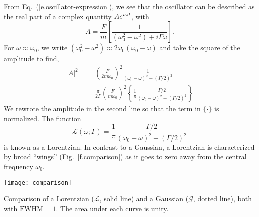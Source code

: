 From Eq.~(\ref{e.oscillator-expression}), we see that the oscillator can be described as the real part of a complex quantity $Ae^{i\omega t}$, with
\[
    A = \frac{F}{m}\left[\frac{1}{\left(\omega_0^2-\omega^2\right) + i\Gamma\omega}\right].
\]
For $\omega \approx \omega_0$, we write $(\omega_0^2-\omega^2)\approx 2\omega_0(\omega_0-\omega)$ and take the square of the amplitude to find,
\begin{eqnarray}
    \left|A\right|^2 &=& \left(\frac{F}{2m\omega_0}\right)^2
        \frac{1}{(\omega_0-\omega)^2 + (\Gamma/2)^2}\nonumber\\
    &=& \frac{\pi}{2\Gamma}\left(\frac{F}{m\omega_0}\right)^2
        \left\{\frac{1}{\pi}\frac{\Gamma/2}{(\omega_0-\omega)^2 + (\Gamma/2)^2}\right\}
\end{eqnarray}
We rewrote the amplitude in the second line so that the term in $\{\cdot\}$ is normalized. The function
\[
    \mathcal{L}(\omega;\Gamma) = \frac{1}{\pi} 
        \frac{\Gamma/2}{(\omega_0-\omega)^2 + (\Gamma/2)^2}
\]
is known as a Lorentzian.  In contrast to a Gaussian, a Lorentzian is characterized by broad ``wings'' (Fig.~\ref{f.comparison}) as it goes to zero away from the central frequency $\omega_{0}$.
\begin{marginfigure}[-4\baselineskip]
\texttt{[image: comparison]}
\caption[Comparison of Lorentzian and Gaussian distributions]{\label{f.comparison}
Comparison of a Lorentzian ($\mathcal{L}$, solid line) and a Gaussian ($\mathcal{G}$, dotted line), both with $\mathrm{FWHM}=1$. The area under each curve is unity.}
\end{marginfigure}

